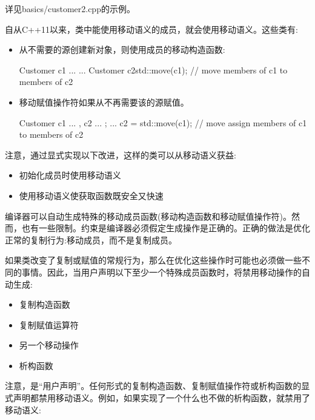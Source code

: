 详见basics/customer2.cpp的示例。\par

自从C++11以来，类中能使用移动语义的成员，就会使用移动语义。这些类有:\par

\begin{itemize}
  \item 从不需要的源创建新对象，则使用成员的移动构造函数:\par
\begin{codebox}[cpp]
  Customer c1{ ... }
  ...
  Customer c2{std::move(c1)}; // move members of c1 to members of c2
\end{codebox}
  \item 移动赋值操作符如果从不再需要该的源赋值。\par
\begin{codebox}[cpp]
  Customer c1{ ... }, c2{ ... };
  ...
  c2 = std::move(c1); // move assign members of c1 to members of c2
\end{codebox}
\end{itemize}

注意，通过显式实现以下改进，这样的类可以从移动语义获益:\par

\begin{itemize}
  \item 初始化成员时使用移动语义
  \item 使用移动语义使获取函数既安全又快速
\end{itemize}


编译器可以自动生成特殊的移动成员函数(移动构造函数和移动赋值操作符)。然而，也有一些限制。约束是编译器必须假定生成操作是正确的。正确的做法是优化正常的复制行为:移动成员，而不是复制成员。\par

如果类改变了复制或赋值的常规行为，那么在优化这些操作时可能也必须做一些不同的事情。因此，当用户声明以下至少一个特殊成员函数时，将禁用移动操作的自动生成:\par

\begin{itemize}
  \item 复制构造函数
  \item 复制赋值运算符
  \item 另一个移动操作
  \item 析构函数
\end{itemize}

注意，是“用户声明”。任何形式的复制构造函数、复制赋值操作符或析构函数的显式声明都禁用移动语义。例如，如果实现了一个什么也不做的析构函数，就禁用了移动语义:\par

